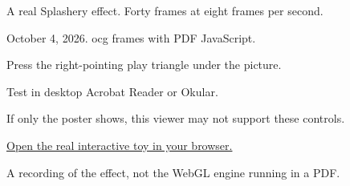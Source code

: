 \documentclass[11pt]{article}
\begin{document}
\par\medskip
\noindent A real Splashery effect. Forty frames at eight frames per second.\par
\noindent October 4, 2026. ocg frames with PDF JavaScript.\par\bigskip
\begin{center}
\end{center}
\noindent Press the right-pointing play triangle under the picture.\par
\noindent Test in desktop Acrobat Reader or Okular.\par
\noindent If only the poster shows, this viewer may not support these controls.\par\medskip
\noindent\href{https://ryanjosephkamp.github.io/splashery/embed/?toy=grapes}{Open the real interactive toy in your browser.}\par
\vfill\noindent\small A recording of the effect, not the WebGL engine running in a PDF.
\end{document}
